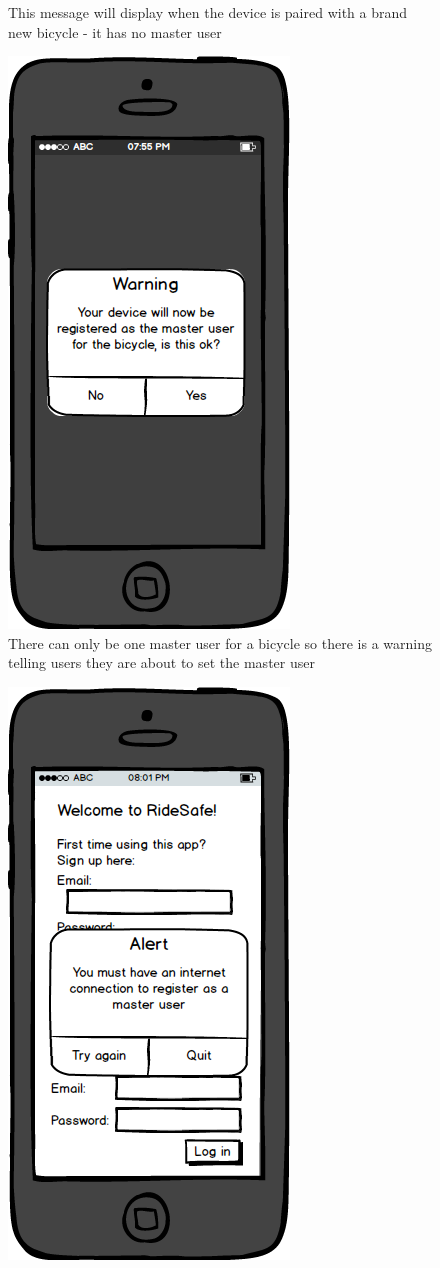 \documentclass[a4paper]{report}
\begin{document}
{\begin{figure}
\caption{This message will display when the device is paired with a brand new bicycle - it has no master user}
\end{figure}
\clearpage
\begin{figure}
\centering
\includegraphics[scale=0.9]{figures/prototype_2/reg_warn}
\caption{There can only be one master user for a bicycle so there is a warning telling users they are about to set the master user}
\end{figure}
\clearpage
\begin{figure}
\centering
\includegraphics[scale=0.9]{figures/prototype_2/no_conn_master}

\end{figure}}
\end{document}
